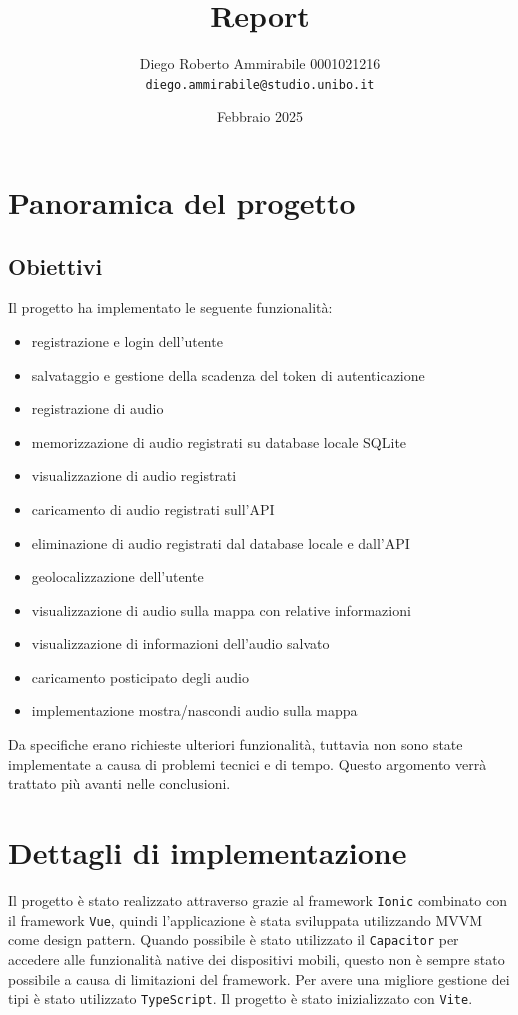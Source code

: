 \documentclass{article}
\author{Diego Roberto Ammirabile 0001021216 \\ \texttt{diego.ammirabile@studio.unibo.it}}
\date{Febbraio 2025}
\title{Report}
\begin{document}
\maketitle
\tableofcontents

\section{Panoramica del progetto}
\subsection{Obiettivi}
Il progetto ha implementato le seguente funzionalità:
\begin{itemize}
    \item registrazione e login dell'utente
    \item salvataggio e gestione della scadenza del token di autenticazione
    \item registrazione di audio
    \item memorizzazione di audio registrati su database locale SQLite
    \item visualizzazione di audio registrati
    \item caricamento di audio registrati sull'API
    \item eliminazione di audio registrati dal database locale e dall'API
    \item geolocalizzazione dell'utente
    \item visualizzazione di audio sulla mappa con relative informazioni
    \item visualizzazione di informazioni dell'audio salvato
    \item caricamento posticipato degli audio
    \item implementazione mostra/nascondi audio sulla mappa
\end{itemize}
Da specifiche erano richieste ulteriori funzionalità, tuttavia non sono state implementate a causa di problemi tecnici e di tempo. Questo argomento verrà trattato più avanti nelle conclusioni.
\section{Dettagli di implementazione}
Il progetto è stato realizzato attraverso grazie al framework \texttt{Ionic} combinato con il framework \texttt{Vue}, quindi l'applicazione è stata sviluppata utilizzando MVVM come design pattern. Quando possibile è stato utilizzato il \texttt{Capacitor} per accedere alle funzionalità native dei dispositivi mobili, questo non è sempre stato possibile a causa di limitazioni del framework. Per avere una migliore gestione dei tipi è stato utilizzato \texttt{TypeScript}. Il progetto è stato inizializzato con \texttt{Vite}.
\end{document}
